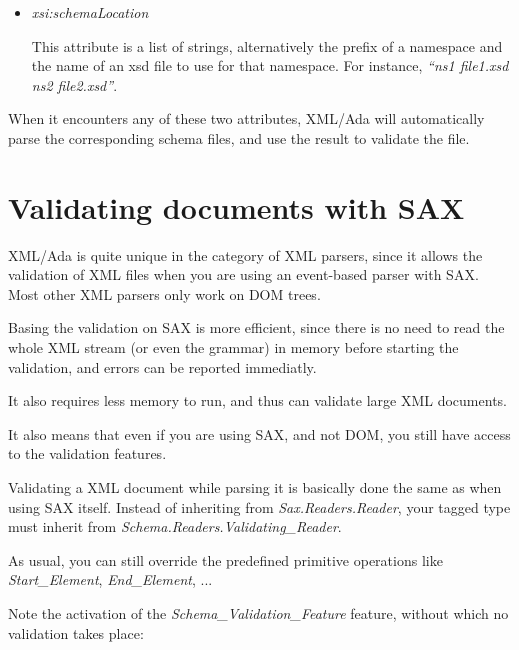 \documentclass[letterpaper,10pt,english]{sphinxmanual}
\begin{document}
\begin{itemize}
\begin{itemize}
\item {} 
\emph{xsi:schemaLocation}

This attribute is a list of strings, alternatively the prefix of
a namespace and the name of an xsd file to use for that
namespace. For instance, \emph{``ns1 file1.xsd ns2 file2.xsd''}.

\end{itemize}

When it encounters any of these two attributes, XML/Ada will
automatically parse the corresponding schema files, and use the result
to validate the file.

\end{itemize}


\section{Validating documents with SAX}
\label{schema:validating-documents-with-sax}
XML/Ada is quite unique in the category of XML parsers, since it allows the
validation of XML files when you are using an event-based parser with SAX.
Most other XML parsers only work on DOM trees.

Basing the validation on SAX is more efficient, since there is no need to read
the whole XML stream (or even the grammar) in memory before starting the
validation, and errors can be reported immediatly.

It also requires less memory to run, and thus can validate large XML
documents.

It also means that even if you are using SAX, and not DOM, you still have
access to the validation features.

Validating a XML document while parsing it is basically done the same as when
using SAX itself. Instead of inheriting from \emph{Sax.Readers.Reader}, your tagged
type must inherit from \emph{Schema.Readers.Validating\_Reader}.

As usual, you can still override the predefined primitive operations like
\emph{Start\_Element}, \emph{End\_Element}, ...

Note the activation of the \emph{Schema\_Validation\_Feature} feature, without which
no validation takes place:
\end{document}

